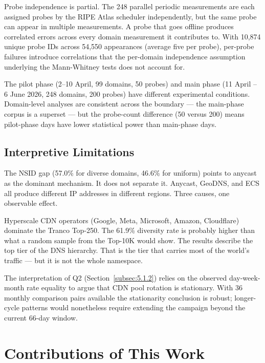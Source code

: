 Probe independence is partial. The 248 parallel periodic measurements are each assigned probes by the RIPE Atlas scheduler independently, but the same probe can appear in multiple measurements. A probe that goes offline produces correlated errors across every domain measurement it contributes to. With 10,874 unique probe IDs across 54,550 appearances (average five per probe), per-probe failures introduce correlations that the per-domain independence assumption underlying the Mann-Whitney tests does not account for.

The pilot phase (2--10 April, 99 domains, 50 probes) and main phase (11 April -- 6 June 2026, 248 domains, 200 probes) have different experimental conditions. Domain-level analyses are consistent across the boundary --- the main-phase corpus is a superset --- but the probe-count difference (50 versus 200) means pilot-phase days have lower statistical power than main-phase days.

\bigskip
\subsection{Interpretive Limitations}
\label{subsec:5.2.3}

The \ac{NSID} gap (57.0\% for diverse domains, 46.6\% for uniform) points to anycast as the dominant mechanism. It does not separate it. Anycast, GeoDNS, and \ac{ECS} all produce different \ac{IP} addresses in different regions. Three causes, one observable effect.

Hyperscale \ac{CDN} operators (Google, Meta, Microsoft, Amazon, Cloudflare) dominate the Tranco Top-250. The 61.9\% diversity rate is probably higher than what a random sample from the Top-10K would show. The results describe the top tier of the \ac{DNS} hierarchy. That is the tier that carries most of the world's traffic --- but it is not the whole namespace.

The interpretation of Q2 (Section~\ref{subsec:5.1.2}) relies on the observed day-week-month rate equality to argue that \ac{CDN} pool rotation is stationary. With 36 monthly comparison pairs available the stationarity conclusion is robust; longer-cycle patterns would nonetheless require extending the campaign beyond the current 66-day window.

\bigskip
\section{Contributions of This Work}
\label{sec:5.3}

